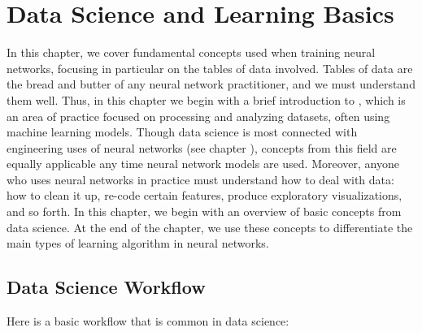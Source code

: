 \chapter{Data Science and Learning Basics}\label{ch_data_science}

In this chapter, we cover fundamental concepts used when training neural networks, focusing in particular on the tables of data involved. Tables of data are the bread and butter of any neural network practitioner, and we must understand them well.  Thus, in this chapter we begin with a brief introduction to , which is an area of practice focused on processing and analyzing datasets, often using machine learning models. Though data science is most connected with engineering uses of neural networks (see chapter ), concepts from this field are equally applicable any time neural network models are used. Moreover, anyone who uses neural networks in practice must understand how to deal with data: how to clean it up, re-code certain features, produce exploratory visualizations, and so forth. In this chapter, we begin with an overview of basic concepts from data science. At the end of the chapter, we use these concepts to differentiate the main types of learning algorithm in neural networks.

\section{Data Science Workflow}

Here is a basic workflow that is common in data science:

